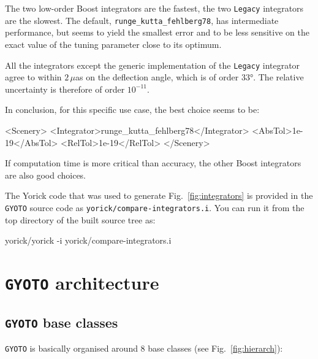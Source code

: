 \documentclass[a4paper,12pt]{article}
\begin{document}
The two low-order Boost integrators are the fastest, the two
\texttt{Legacy} integrators are the slowest. The default,
\texttt{runge\_kutta\_fehlberg78}, has intermediate performance, but
seems to yield the smallest error and to be less sensitive on the
exact value of the tuning parameter close to its optimum.

All the integrators except the generic implementation of the
\texttt{Legacy} integrator agree to within $2\,\mu$as on the
deflection angle, which is of order 33°. The relative uncertainty is
therefore of order $10^{-11}$.

In conclusion, for this specific use case, the best choice seems to be:
\begin{code}
<Scenery>
 <Integrator>runge_kutta_fehlberg78</Integrator>
 <AbsTol>1e-19</AbsTol>
 <RelTol>1e-19</RelTol>
</Scenery>
\end{code}
If computation time is more critical than accuracy, the other Boost
integrators are also good choices.

The Yorick code that was used to generate Fig.~\ref{fig:integrators}
is provided in the \texttt{GYOTO} source code as
\texttt{yorick/compare-integrators.i}. You can run it from the top
directory of the built source tree as:
\begin{code}
  yorick/yorick -i yorick/compare-integrators.i
\end{code}

\section{\texttt{GYOTO} architecture}
\label{archi}

\subsection{\texttt{GYOTO} base classes}

\texttt{GYOTO} is basically organised around 8 base classes (see Fig.~\ref{fig:hierarch}):
\end{document}

